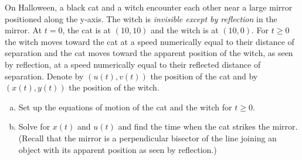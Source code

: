 On Halloween, a black cat and a witch encounter each other near a large mirror
positioned along the y-axis. The witch is {\it invisible except by reflection}
in the mirror. At $t=0$, the cat is at $(10, 10)$ and the witch is at $(10,0)$.
For $t\ge0$ the witch moves toward the cat at a speed numerically equal to
their distance of separation and the cat moves toward the apparent position of
the witch, as seen by reflection, at a speed numerically equal to their
reflected distance of separation. Denote by $(u(t), v(t))$ the position of the
cat and by $(x(t), y(t))$ the position of the witch.

\begin{enumerate}[(a)]

\item Set up the equations of motion of the cat and the witch for $t\ge0$.
\item Solve for $x(t)$ and $u(t)$ and find the time when the cat strikes the
      mirror. (Recall that the mirror is a perpendicular bisector of the line
      joining an object with its apparent position as seen by reflection.)

\end{enumerate}
